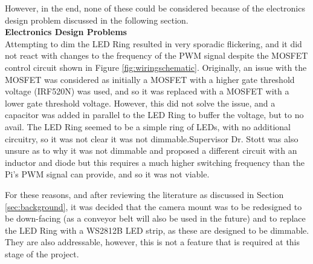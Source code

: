 \vspace{-0.5em}
\noindent
However, in the end, none of these could be considered because of the electronics design problem discussed in the following section. \\
\noindent
\textbf{Electronics Design Problems} \\
Attempting to dim the LED Ring resulted in very sporadic flickering, and it did not react with changes to the frequency of the PWM signal despite the MOSFET control circuit shown in Figure \ref*{fig:wiringschematic}.
Originally, an issue with the MOSFET was considered as initially a MOSFET with a higher gate threshold voltage (IRF520N) was used, and so it was replaced with a MOSFET with a lower gate threshold voltage.
However, this did not solve the issue, and a capacitor was added in parallel to the LED Ring to buffer the voltage, but to no avail.
The LED Ring seemed to be a simple ring of LEDs, with no additional circuitry, so it was not clear it was not dimmable.Supervisor Dr. Stott was also unsure as to why it was not dimmable and proposed a different circuit with an inductor and diode but this requires
a much higher switching frequency than the Pi's PWM signal can provide, and so it was not viable. 

For these reasons, and after reviewing the literature as discussed in Section \ref*{sec:background}, it was decided that the camera mount was to be redesigned to be down-facing (as a conveyor belt will also be used in the future)
and to replace the LED Ring with a WS2812B LED strip, as these are designed to be dimmable. They are also addressable, however, this is not a feature that is required at this stage of the project.
